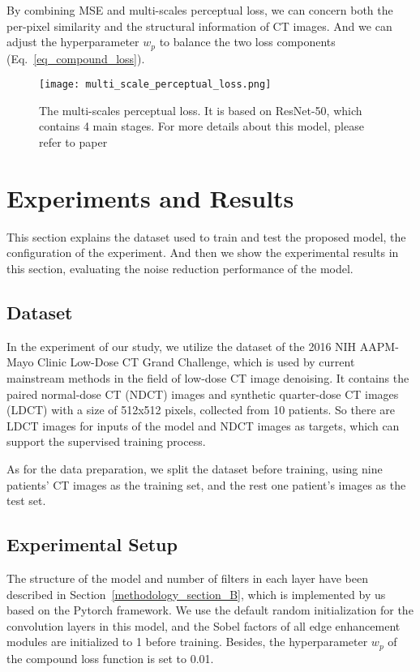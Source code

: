 \documentclass[conference]{IEEEtran}
\begin{document}
                By combining MSE and multi-scales perceptual loss, we can concern both the per-pixel similarity and the structural information of CT images.
                And we can adjust the hyperparameter $w_{p}$ to balance the two loss components (Eq.~\ref{eq_compound_loss}).

                \begin{figure}[t]
                    \texttt{[image: multi\_scale\_perceptual\_loss.png]}
                    \caption{The multi-scales perceptual loss. It is based on ResNet-50, which contains 4 main stages. For more details about this model, please refer to paper \cite{He_2016_CVPR}}
                    \label{multi_scale_perceptual_loss}
                \end{figure}

    \section{Experiments and Results}
        This section explains the dataset used to train and test the proposed model, the configuration of the experiment. 
        And then we show the experimental results in this section, evaluating the noise reduction performance of the model.

        \subsection{Dataset}
            In the experiment of our study, we utilize the dataset of the 2016 NIH AAPM-Mayo Clinic Low-Dose CT Grand Challenge\cite{mccollough_low-dose_2017}, which is used by current mainstream methods in the field of low-dose CT image denoising.
            It contains the paired normal-dose CT (NDCT) images and synthetic quarter-dose CT images (LDCT) with a size of 512x512 pixels, collected from 10 patients.
            So there are LDCT images for inputs of the model and NDCT images as targets, which can support the supervised training process.

            As for the data preparation, we split the dataset before training, using nine patients' CT images as the training set, and the rest one patient's images as the test set.
            
        \subsection{Experimental Setup}
            The structure of the model and number of filters in each layer have been described in Section~\ref{methodology_section_B}, which is implemented by us based on the Pytorch framework\cite{NIPS2019_9015}. 
            We use the default random initialization for the convolution layers in this model, and the Sobel factors of all edge enhancement modules are initialized to 1 before training.
            Besides, the hyperparameter $w_{p}$ of the compound loss function is set to 0.01.
\end{document}
